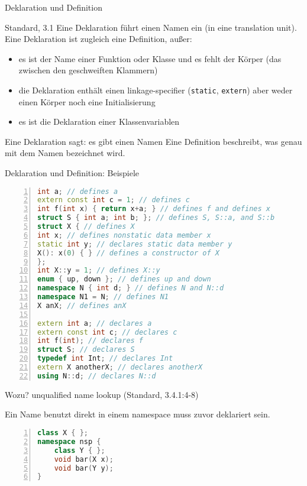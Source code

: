 \begin{frame}[fragile]{Deklaration und Definition}
	\begin{block}{Standard, 3.1}
		Eine Deklaration führt einen Namen ein (in eine translation unit).
		Eine Deklaration ist zugleich eine Definition, außer:
		\begin{itemize}[<+->]
			\item es ist der Name einer Funktion oder Klasse und es fehlt der Körper {\tiny (das zwischen den geschweiften Klammern) }
			\item die Deklaration enthält einen linkage-specifier (\verb|static|, \verb|extern|) aber weder einen Körper noch eine Initialisierung
			\item es ist die Deklaration einer Klassenvariablen
		\end{itemize}
	\end{block}
	
	\vspace{1em}
	
	\uncover<+->
	{
		Eine Deklaration sagt: es gibt einen Namen
		Eine Definition beschreibt, was genau mit dem Namen bezeichnet wird.
	}
\end{frame}

\begin{frame}[fragile]{Deklaration und Definition: Beispiele}
	\footnotesize
	\begin{lstlisting}[language=C++, basicstyle=\footnotesize, numbers=left, numberstyle=\tiny\color{gray}, tabsize=6, xleftmargin=2em]
int a; // defines a
extern const int c = 1; // defines c
int f(int x) { return x+a; } // defines f and defines x
struct S { int a; int b; }; // defines S, S::a, and S::b
struct X { // defines X
int x; // defines nonstatic data member x
static int y; // declares static data member y
X(): x(0) { } // defines a constructor of X
};
int X::y = 1; // defines X::y
enum { up, down }; // defines up and down
namespace N { int d; } // defines N and N::d
namespace N1 = N; // defines N1
X anX; // defines anX

extern int a; // declares a
extern const int c; // declares c
int f(int); // declares f
struct S; // declares S
typedef int Int; // declares Int
extern X anotherX; // declares anotherX
using N::d; // declares N::d
	\end{lstlisting}
\end{frame}

\begin{frame}[fragile]{Wozu?}
	unqualified name lookup (Standard, 3.4.1:4-8)
	
	Ein Name benutzt direkt in einem namespace muss zuvor deklariert sein.
	\begin{lstlisting}[language=C++, basicstyle=\footnotesize, numbers=left, numberstyle=\tiny\color{gray}, tabsize=6, xleftmargin=2em]
class X { };
namespace nsp {
	class Y { };
	void bar(X x);
	void bar(Y y);
}
	\end{lstlisting}
\end{frame}

